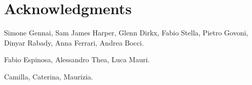 \chapter{Acknowledgments}

Simone Gennai, Sam James Harper, Glenn Dirkx, Fabio Stella, Pietro Govoni, Dinyar Rabady, Anna Ferrari, Andrea Bocci.

Fabio Espinosa, Alessandro Thea, Luca Mauri.

Camilla, Caterina, Maurizia.